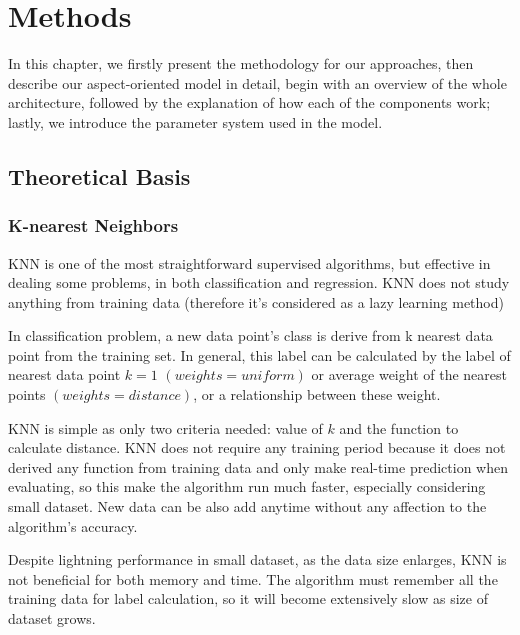 \chapter{Methods}
\label{chap:model}

In this chapter, we firstly present the methodology for our approaches, then describe our aspect-oriented model in detail, begin with an overview of the whole architecture, followed by the explanation of how each of the components work; lastly, we introduce the parameter system used in the model.

\section{Theoretical Basis}
\subsection{K-nearest Neighbors}

KNN is one of the most straightforward supervised algorithms, but effective in dealing some problems, in both classification and regression. KNN does not study anything from training data (therefore it's considered as a lazy learning method)

In classification problem, a new data point's class is derive from k nearest data point from the training set. In general, this label can be calculated by the label of nearest data point \(k=1\) $(weights = uniform)$ or average weight of the nearest points $(weights = distance)$, or a relationship between these weight.

KNN is simple as only two criteria needed: value of \(k\) and the function to calculate distance. KNN does not require any training period because it does not derived any function from training data and only make real-time prediction when evaluating, so this make the algorithm run much faster, especially considering small dataset. New data can be also add anytime without any affection to the algorithm's accuracy.  

Despite lightning performance in small dataset, as the data size enlarges, KNN is not beneficial for both memory and time. The algorithm must remember all the training data for label calculation, so it will become extensively slow as size of dataset grows.

